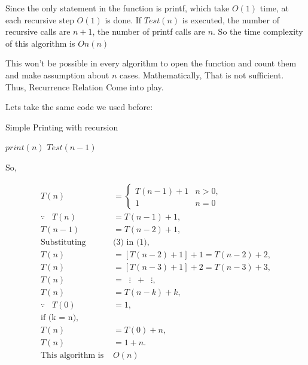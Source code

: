 \documentclass[]{article}
\theoremstyle{plain}
\theoremstyle{definition}
\begin{document}
Since the only statement in the function is printf, which take $O(1)$ time, at each recursive step $O(1)$ is done. If $Test(n)$ is executed, the number of recursive calls are $n+1$, the number of printf calls are $n$.
So the time complexity of this algorithm is $On(n)$

This won't be possible in every algorithm to open the function and count them and make assumption about $n$ cases. Mathematically, That is not sufficient. Thus, Recurrence Relation Come into play.

Lets take the same code we used before:

\begin{algorithm}[H]
    \caption{Simple Printing with recursion}
    \label{printRecursion}
    \begin{algorithmic}
         
            \State$print(n)$ 
            \State$Test(n-1)$  
        \EndIf
        \EndProcedure
    \end{algorithmic}
\end{algorithm}

So,

\[
\begin{aligned}
    T(n) &=
    \begin{cases}
        T(n - 1) + 1 \label{base} & n > 0, \\
        1 & n = 0
    \end{cases} \\
    \because \hspace{10pt} T(n) &= T(n - 1) + 1, \\
    T(n - 1) &= T(n - 2) + 1, \\
    \text{Substituting} & \text{(3) in (1)}, \\
    T(n) &= [T(n - 2) + 1] + 1 = T(n - 2) + 2, \\
    T(n) &= [T(n - 3) + 1] + 2 = T(n - 3) + 3, \\
    T(n) &= \hspace{7pt}\vdots \hspace{7pt}+\hspace{7pt} \vdots, \\
    T(n) &= T(n - k) + k, \\
    \because \hspace{10pt} T(0) &= 1, \\
    \text{if (k = n)}, \\
    T(n) &= T(0) + n, \\
    T(n) &= 1 + n.\\
    \text{This algorithm is } & O(n)
\end{aligned}
\]
\end{document}
